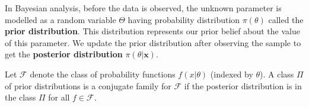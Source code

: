 \begin{defn}
    In Bayesian analysis, before the data is observed, the unknown parameter is modelled as a random variable $\Theta$ having probability distribution $\pi(\theta)$ called the \textbf{prior distribution}. This distribution represents our prior belief about the value of this parameter. We update the prior distribution after observing the sample to get the \textbf{posterior distribution} $\pi(\theta|\bm{x})$.
\end{defn}

\begin{defn}
    Let $\mathcal{F}$ denote the class of probability functions $f(x|\theta)$ (indexed by $\theta$). A class $\Pi$ of prior distributions is a conjugate family for $\mathcal{F}$ if the posterior distribution is in the class $\Pi$ for all $f \in \mathcal{F}$.
\end{defn}
